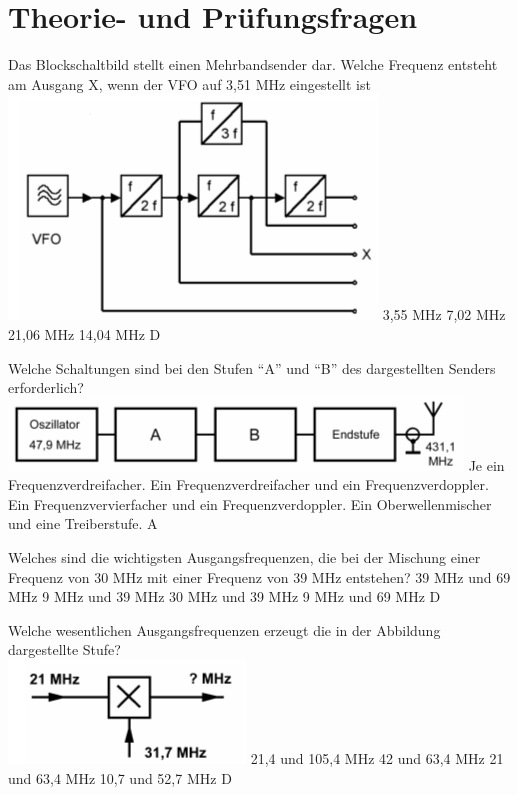 
\section*{Theorie- und Prüfungsfragen} 


{Das Blockschaltbild stellt einen Mehrbandsender dar. Welche Frequenz entsteht am Ausgang X, wenn der VFO auf 3,51 MHz eingestellt ist\\ \includegraphics[scale=0.4]{Frequenzaufbereitung/Bilder/TG103a.png}}%
{3,55 MHz}%
{7,02 MHz}%
{21,06 MHz}%
{14,04 MHz}%
{D}%

{Welche Schaltungen sind bei den Stufen  ``A'' und  ``B''  des dargestellten Senders erforderlich?\\ \includegraphics[scale=0.4]{Frequenzaufbereitung/Bilder/TG105.png}}%
{Je ein Frequenzverdreifacher.}%
{Ein Frequenzverdreifacher und ein Frequenzverdoppler.}%
{Ein Frequenzvervierfacher und ein Frequenzverdoppler.}%
{Ein Oberwellenmischer und eine Treiberstufe.}%
{A}%

{Welches sind die wichtigsten Ausgangsfrequenzen, die bei der Mischung einer Frequenz von 30 MHz mit einer Frequenz von 39 MHz entstehen?}%
{39 MHz und 69 MHz}%
{9 MHz und 39 MHz}%
{30 MHz und 39 MHz}%
{9 MHz und 69 MHz}%
{D}%

{Welche wesentlichen Ausgangsfrequenzen erzeugt die in der Abbildung dargestellte Stufe?\\ \includegraphics[scale=0.4]{Frequenzaufbereitung/Bilder/TG226.png}}%
{21,4 und 105,4 MHz}%
{42 und 63,4 MHz}%
{21 und 63,4 MHz}%
{10,7 und 52,7 MHz}%
{D}%


